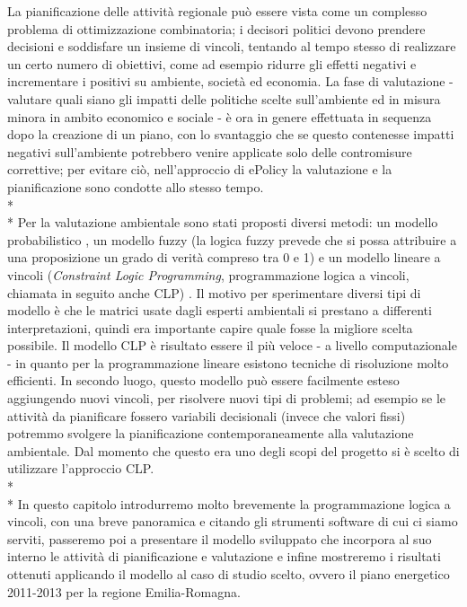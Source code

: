 La pianificazione delle attività regionale può essere vista come un complesso problema di ottimizzazione combinatoria; i decisori politici devono prendere decisioni e soddisfare un insieme di vincoli, tentando al tempo stesso di realizzare un certo numero di obiettivi, come ad esempio ridurre gli effetti negativi e incrementare i positivi su ambiente, società ed economia. La fase di valutazione - valutare quali siano gli impatti delle politiche scelte sull'ambiente ed in misura minora in ambito economico e sociale - è ora in genere effettuata in sequenza dopo la creazione di un piano, con lo svantaggio che se questo contenesse impatti negativi sull'ambiente potrebbero venire applicate solo delle contromisure correttive; per evitare ciò, nell'approccio di ePolicy la valutazione e la pianificazione sono condotte allo stesso tempo.\\*\\*
Per la valutazione ambientale sono stati proposti diversi metodi: un modello probabilistico \cite{logicDSSstrategicAss}, un modello fuzzy (la logica fuzzy prevede che si possa attribuire a una proposizione un grado di verità compreso tra 0 e 1) \cite{fuzzyLogicstrategicAss} e un modello lineare a vincoli (\emph{Constraint Logic Programming}, programmazione logica a vincoli, chiamata in seguito anche CLP) \cite{GavanelliEtAl}. Il motivo per sperimentare diversi tipi di modello è che le matrici usate dagli esperti ambientali si prestano a differenti interpretazioni, quindi era importante capire quale fosse la migliore scelta possibile. Il modello CLP è risultato essere il più veloce - a livello computazionale - in quanto per la programmazione lineare esistono tecniche di risoluzione molto efficienti. In secondo luogo, questo modello può essere facilmente esteso aggiungendo nuovi vincoli, per risolvere nuovi tipi di problemi; ad esempio se le attività da pianificare fossero variabili decisionali (invece che valori fissi) potremmo svolgere la pianificazione contemporaneamente alla valutazione ambientale. Dal momento che questo era uno degli scopi del progetto si è scelto di utilizzare l'approccio CLP.\\*\\*
In questo capitolo introdurremo molto brevemente la programmazione logica a vincoli, con una breve panoramica e citando gli strumenti software di cui ci siamo serviti, passeremo poi a presentare il modello sviluppato che incorpora al suo interno le attività di pianificazione e valutazione e infine mostreremo i risultati ottenuti applicando il modello al caso di studio scelto, ovvero il piano energetico 2011-2013 per la regione Emilia-Romagna.

